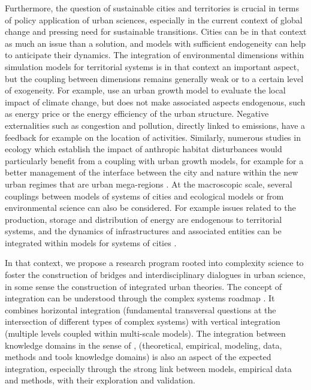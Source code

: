 Furthermore, the question of sustainable cities and territories is crucial in terms of policy application of urban sciences, especially in the current context of global change and pressing need for sustainable transitions. Cities can be in that context as much an issue than a solution, and models with sufficient endogeneity can help to anticipate their dynamics. The integration of environmental dimensions within simulation models for territorial systems is in that context an important aspect, but the coupling between dimensions remains generally weak or to a certain level of exogeneity. For example, \cite{viguie2014downscaling} use an urban growth model to evaluate the local impact of climate change, but does not make associated aspects endogenous, such as energy price or the energy efficiency of the urban structure. Negative externalities such as congestion and pollution, directly linked to emissions, have a feedback for example on the location of activities. Similarly, numerous studies in ecology which establish the impact of anthropic habitat disturbances would particularly benefit from a coupling with urban growth models, for example for a better management of the interface between the city and nature within the new urban regimes that are urban mega-regions \cite{hall2006polycentric}. At the macroscopic scale, several couplings between models of systems of cities and ecological models or from environmental science can also be considered. For example issues related to the production, storage and distribution of energy are endogenous to territorial systems, and the dynamics of infrastructures and associated entities can be integrated within models for systems of cities \cite{pumain2018evolutionary}.


In that context, we propose a research program rooted into complexity science to foster the construction of bridges and interdisciplinary dialogues in urban science, in some sense the construction of integrated urban theories. The concept of integration can be understood through the complex systems roadmap \cite{bourgine2009french}. It combines horizontal integration (fundamental transversal questions at the intersection of different types of complex systems) with vertical integration (multiple levels coupled within multi-scale models). The integration between knowledge domains in the sense of \cite{raimbault2017applied}, (theoretical, empirical, modeling, data, methods and tools knowledge domains) is also an aspect of the expected integration, especially through the strong link between models, empirical data and methods, with their exploration and validation.

